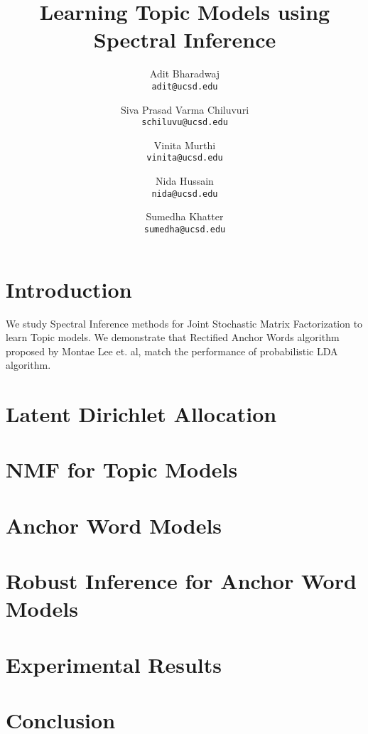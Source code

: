 \documentclass{article}
\title{Learning Topic Models using Spectral Inference}
\author{
	Adit Bharadwaj\\
	\texttt{adit@ucsd.edu}\\
	\and
	Siva Prasad Varma Chiluvuri \\
	\texttt{schiluvu@ucsd.edu}
	\and
	Vinita Murthi\\
	\texttt{vinita@ucsd.edu}\\
	\and
	Nida Hussain\\
	\texttt{nida@ucsd.edu}
	\and
	Sumedha Khatter\\
	\texttt{sumedha@ucsd.edu}
}
\begin{document}
\maketitle
\section{Introduction}
We study Spectral Inference methods for Joint Stochastic Matrix Factorization 
to learn Topic models. We demonstrate that Rectified Anchor Words algorithm 
proposed by Montae Lee et. al, match the performance of probabilistic LDA 
algorithm.

\section{Latent Dirichlet Allocation}


\section{NMF for Topic Models}



\section{Anchor Word Models}


\section{Robust Inference for Anchor Word Models}


\section{Experimental Results}



\section{Conclusion}

\end{document}
